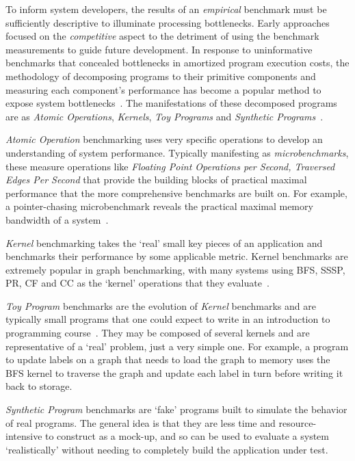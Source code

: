 To inform system developers, the results of an \textit{empirical} benchmark must be sufficiently descriptive to illuminate processing bottlenecks. 
Early approaches focused on the \textit{competitive} aspect to the detriment of using the benchmark measurements to guide future development. 
In response to uninformative benchmarks that concealed bottlenecks in amortized program execution costs, the methodology of decomposing programs to their primitive components and measuring each component's performance has become a popular method to expose system bottlenecks~\cite{Saavedra1996}. 
The manifestations of these decomposed programs are as \textit{Atomic Operations}, \textit{Kernels}, \textit{Toy Programs} and \textit{Synthetic Programs}~\cite{Hennessy2019}. 

\textit{Atomic Operation} benchmarking uses very specific operations to develop an understanding of system performance. 
Typically manifesting as \textit{microbenchmarks}, these measure operations like \textit{Floating Point Operations per Second, Traversed Edges Per Second} that provide the building blocks of practical maximal performance that the more comprehensive benchmarks are built on.
For example, a pointer-chasing microbenchmark reveals the practical maximal memory bandwidth of a system~\cite{Beamer2015}.

\textit{Kernel} benchmarking takes the `real' small key pieces of an application and benchmarks their performance by some applicable metric. 
Kernel benchmarks are extremely popular in graph benchmarking, with many systems using BFS, SSSP, PR, CF and CC as the `kernel' operations that they evaluate~\cite{Satish2014, Wang2016, Kang2009, Fu2014, Dadu2021, Beamer2017, Dhulipala2020}.

\textit{Toy Program} benchmarks are the evolution of \textit{Kernel} benchmarks and are typically small programs that one could expect to write in an introduction to programming course~\cite{Hennessy2019}.
They may be composed of several kernels and are representative of a `real' problem, just a very simple one. 
For example, a program to update labels on a graph that needs to load the graph to memory uses the BFS kernel to traverse the graph and update each label in turn before writing it back to storage.

\textit{Synthetic Program} benchmarks are `fake' programs built to simulate the behavior of real programs. 
The general idea is that they are less time and resource-intensive to construct as a mock-up, and so can be used to evaluate a system  `realistically' without needing to completely build the application under test. 

